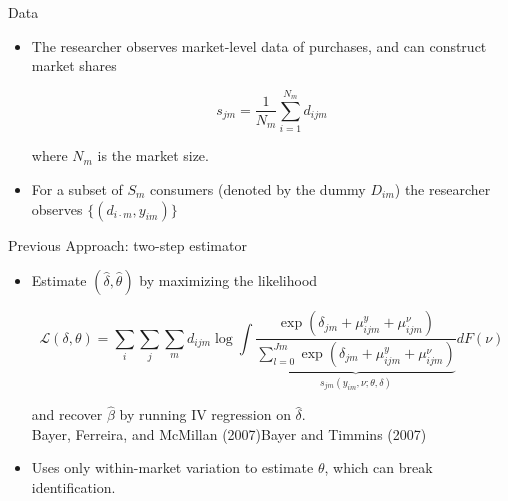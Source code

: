 \documentclass[aspectratio=169,10pt]{beamer}
\begin{document}
\begin{frame}{Data}
    \begin{itemize}
        \item The researcher observes market-level data of purchases, and can construct market shares
    
            \begin{equation}
                s_{jm} = \frac{1}{N_m}\sum_{i=1}^{N_m}d_{ijm}
            \end{equation}
            
            where $N_m$ is the market size.
            
        \item For a subset of $S_m$ consumers (denoted by the dummy $D_{im}$) the researcher observes $\{(d_{i\cdot m},y_{im})\}$
    \end{itemize}
\end{frame}



\begin{frame}{Previous Approach: two-step estimator}

    \begin{itemize}
    
        \item Estimate $(\hat{\delta}, \hat{\theta})$ by maximizing the likelihood
        
        $$\mathcal{L}(\delta,\theta) =  \sum_i\sum_j\sum_m d_{ijm} \log \int \frac{\exp{(\delta_{jm} + \mu_{ijm}^{y} + \mu_{ijm}^{\nu})}}{\underbrace{\sum_{l=0}^{Jm}\exp{(\delta_{jm} + \mu_{ijm}^{y} + \mu_{ijm}^{\nu})}}_{s_{jm}(y_{im},\nu;\theta,\delta)}} dF(\nu)$$
        
        and recover $\hat{\beta}$ by running IV regression on $\hat{\delta}$.\\
        
        {\tiny Bayer, Ferreira, and McMillan (2007)\quad Bayer and Timmins (2007)}
        \item Uses only within-market variation to estimate $\theta$, which can break identification.
    
    \end{itemize}
\end{frame}
\end{document}
